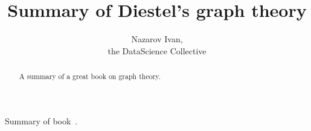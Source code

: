 \documentclass[a4paper]{article}
\title{Summary of Diestel's graph theory}
\author{Nazarov Ivan, \rus{101мНОД(ИССА)}\\the DataScience Collective}
\begin{document}
\maketitle

\begin{abstract}
	A summary of a great book on graph theory.
\end{abstract}

\tableofcontents
\clearpage

Summary of book~\cite{diestel2006}.



\end{document}
